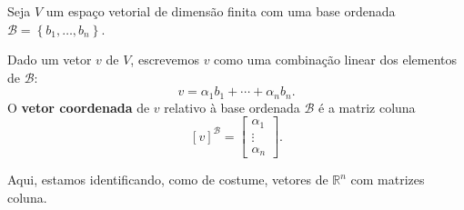 \begin{definition}
	Seja $V$ um espaço vetorial de dimensão finita com uma base ordenada $\mathcal{B}=\left\{b_1,\ldots,b_n\right\}$.
	
	Dado um vetor $v$ de $V$, escrevemos $v$ como uma combinação linear dos elementos de $\mathcal{B}$:
	\[v=\alpha_1 b_1+\cdots+\alpha_n b_n.\]
	O \textbf{vetor coordenada} de $v$ relativo à base ordenada $\mathcal{B}$ é a matriz coluna
	\[[v]^{\mathcal{B}}=\begin{bmatrix}\alpha_1\\\vdots\\\alpha_n\end{bmatrix}.\]
	
	Aqui, estamos identificando, como de costume, vetores de $\mathbb{R}^n$ com matrizes coluna.
\end{definition}